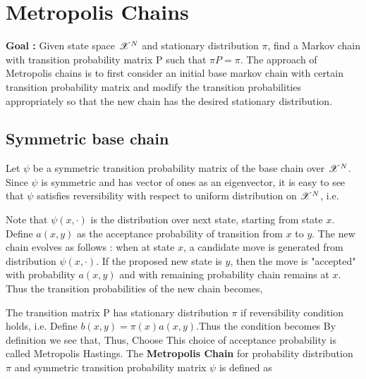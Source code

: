 \documentclass[letterpaper,english,10pt]{article}
\begin{document}
\section{Metropolis Chains}
\textbf{Goal :} Given state space $\mathscr{X}^N$ and stationary distribution $\pi$, find a Markov chain with transition probability matrix P such that $\pi P = \pi$.
\newline
The approach of Metropolis chains is to first consider an initial base markov chain with certain transition probability matrix and modify the transition probabilities appropriately so that the new chain has the desired stationary distribution. 

\subsection{Symmetric base chain}
Let $\psi$ be a symmetric transition probability matrix of the base chain over $\mathscr{X}^N$.
\newline
Since $\psi$ is symmetric and has vector of ones as an eigenvector, it is easy to see that $\psi$ satisfies reversibility with respect to uniform distribution on $\mathscr{X}^N$, i.e.

Note that $\psi(x,\cdot)$ is the distribution over next state, starting from state $x$.
Define $a(x,y)$ as the acceptance probability of transition from $x$ to $y$.
The new chain evolves as follows : when at state $x$, a candidate move is generated from distribution $\psi(x,\cdot)$. If the proposed new state is $y$, then the move is "accepted" with probability $a(x,y)$ and with remaining probability chain remains at $x$. Thus the transition probabilities of the new chain becomes,


The transition matrix P has stationary distribution $\pi$ if reversibility condition holds, i.e.
Define $b(x,y) = \pi(x)a(x,y)$.Thus the condition becomes 
By definition we see that,
Thus,
Choose 
This choice of acceptance probability is called Metropolis Hastings.
The \textbf{Metropolis Chain} for probability distribution $\pi$ and symmetric transition probability matrix $\psi$ is defined as
\end{document}

